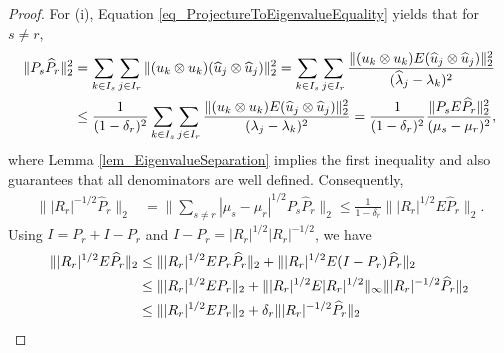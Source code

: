 \documentclass[a4paper,11pt]{article} %
\numberwithin{equation}{section}
\theoremstyle{definition}
\theoremstyle{remark}
\theoremstyle{plain}
\begin{document}
\begin{proof}%
  For (i), Equation \eqref{eq_ProjectureToEigenvalueEquality} yields that for
  \( s \ne r \),
  \begin{align}
          \| P_{s} \widehat{P}_{r} \|_{2}^{2} 
    & = 
          \sum_{ k \in I_{s} } \sum_{ j \in I_{r} } 
          \| ( u_{k} \otimes u_{k} ) 
             ( \widehat{u}_{j} \otimes \widehat{u}_{j}) 
          \|_{2}^{2}
    = 
          \sum_{ k \in I_{s} } \sum_{ j \in I_{r} } 
          \frac{ \| ( u_{k} \otimes u_{k} ) E
                    ( \widehat{u}_{j} \otimes \widehat{u}_{j}) 
                 \|_{2}^{2}
               }{ ( \widehat{ \lambda }_{j} - \lambda_{k} )^{2} } 
    \\
    & \le 
          \frac{1}{ ( 1 - \delta_{r} )^{2} }
          \sum_{ k \in I_{s} } \sum_{ j \in I_{r} } 
          \frac{ \| ( u_{k} \otimes u_{k} ) E
                    ( \widehat{u}_{j} \otimes \widehat{u}_{j}) 
                 \|_{2}^{2}
               }{ ( \lambda_{j} - \lambda_{k} )^{2} } 
    = 
          \frac{1}{ ( 1 - \delta_{r} )^{2} }
          \frac{ \| P_{s} E \widehat{P}_{r} \|_{2}^{2} }
               { ( \mu_{s} - \mu_{r})^{2} }, 
    \notag
  \end{align}
  where Lemma \ref{lem_EigenvalueSeparation} implies the first inequality and
  also guarantees that all denominators are well defined.
  Consequently, 
  \begin{align}
    \label{eq_Contraction_i_1}
        \| | R_{r} |^{-1/2} \widehat{P}_{r} \|_{2} 
    & = 
        \| \sum_{ s \ne r } | \mu_{s} - \mu_{r} |^{1/2} P_{s} 
           \widehat{P}_{r} 
        \|_{2}
    \le 
        \frac{1}{ 1 - \delta_{r} } 
        \| | R_{r} |^{1/2} E \widehat{P}_{r} \|_{2}. 
  \end{align}
  Using \( I = P_{r} + I - P_{r} \) and 
  \( I - P_{r} = | R_{r} |^{1/2} | R_{r} |^{-1/2} \), we have
  \begin{align}
            \| | R_{r} |^{1/2} E \widehat{P}_{r} \|_{2}
    & \le
            \| | R_{r} |^{1/2} E       P_{r}   \widehat{P}_{r} \|_{2}
          + 
            \| | R_{r} |^{1/2} E ( I - P_{r} ) \widehat{P}_{r} \|_{2}
    \\
    & \le 
            \| | R_{r} |^{1/2} E P_{r} \|_{2}
          + 
            \| | R_{r} |^{1/2} E | R_{r} |^{1/2} \|_{\infty}
            \| | R_{r} |^{-1/2} \widehat{P}_{r} \|_{2}
    \notag
    \\
    & \le 
            \| | R_{r} |^{1/2} E P_{r} \|_{2}
          + 
            \delta_{r}
            \| | R_{r} |^{-1/2} \widehat{P}_{r} \|_{2}

\end{align}
\end{proof}
\end{document}
